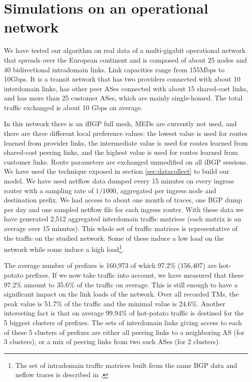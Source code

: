 \documentclass{acm_proc_article-sp}
\begin{document}
\section{Simulations on an operational network}
\label{sec:casestudy}

We have tested our algorithm on real data of a multi-gigabit operational network that spreads over the European continent and is composed of about 25 nodes and 40 bidirectional
intradomain links. Link capacities range from 155Mbps to 10Gbps. It is a transit network  
that has two providers connected with about 10 interdomain
links, has other peer ASes connected with about 15 shared-cost links, and has more
than 25 customer ASes, which are mainly single-homed. The total traffic exchanged is 
about 10 Gbps on average.

In this network there is an iBGP full
mesh, MEDs are currently not used, and there are three different 
local preference values: the lowest value is used for routes learned 
from provider links, the intermediate 
value is used for routes learned from shared-cost peering links, and the highest
value is used for routes learned from customer links. Route parameters are
exchanged unmodified on all iBGP sessions. We have used the technique
exposed in section \ref{sec:datacollect} to build our model. We have
used netflow data dumped every 15 minutes on every
ingress router with a sampling rate of $1/1000$, aggregated per
ingress node and destination prefix.
We had access to about one month of traces, one BGP dump per
day and one sampled netflow file for each ingress router. 
With these data we have generated 2,512 aggregated interdomain
traffic matrices (each matrix is an average over 15
minutes). This whole set of traffic matrices is representative of the
traffic on the studied network. Some of these induce a low load on the
network while some induce a high load\footnote{The set of intradomain
  traffic matrices built from the same BGP data and neflow traces is described in \cite{uhlig-ccr-matrices}.}.

The average number of prefixes is 160,973 of which 97.2\% (156,407) are
hot-potato prefixes.
If we now take traffic into account, we
have measured that these 97.2\% amount to 35.6\% of the traffic on average. 
This is still enough to have a significant impact on the link
loads of the network. Over all recorded TMs, the peak value is 51.7\% of the traffic 
and the minimal value is 24.6\%.
Another interesting fact is that on average 
99.94\% of hot-potato traffic is destined for the 5 biggest clusters of prefixes. 
The sets of interdomain links giving access to each of these 5 clusters of
prefixes are either all peering links to a neighboring AS (for 3 clusters), or a mix of peering
links from two such ASes (for 2 clusters).
\end{document}
